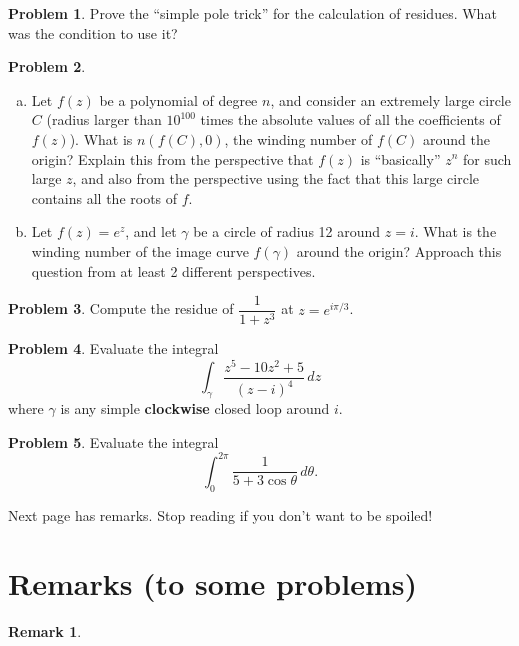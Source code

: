 \documentclass[11pt,oneside]{amsart}
\theoremstyle{definition}
\newtheorem{problem}{Problem}
\newtheorem{remark}{Remark}
\begin{document}
\begin{problem}
  Prove the ``simple pole trick'' for the calculation of residues. What was the condition to use it?
\end{problem}

\begin{problem}
  \leavevmode\begin{enumerate}[(a)]
    \item Let $f(z)$ be a polynomial of degree $n$, and consider an extremely large circle $C$ (radius larger than $10^{100}$ times the absolute values of all the coefficients of $f(z)$). What is $n(f(C),0)$, the winding number of $f(C)$ around the origin? Explain this from the perspective that $f(z)$ is ``basically'' $z^n$ for such large $z$, and also from the perspective using the fact that this large circle contains all the roots of $f$.
    
    \item Let $f(z)=e^z$, and let $\gamma$ be a circle of radius 12 around $z=i$. What is the winding number of the image curve $f(\gamma)$ around the origin? Approach this question from at least 2 different perspectives.
  \end{enumerate}
\end{problem}

\begin{problem}
  Compute the residue of $\dfrac 1{1+z^3}$ at $z=e^{i\pi/3}$.
\end{problem}

\begin{problem}
  Evaluate the integral
  \[\int_\gamma\frac{z^5-10z^2+5}{(z-i)^4}\,dz\]
  where $\gamma$ is any simple \textbf{clockwise} closed loop around $i$.
\end{problem}

\begin{problem}
  Evaluate the integral
  \[\int_0^{2\pi}\frac 1{5+3\cos\theta}\,d\theta.\]
\end{problem}

\vfill

Next page has remarks. Stop reading if you don't want to be spoiled!

\newpage

\section{Remarks (to some problems)}

\begin{remark} %
  
\end{remark}
\end{document}

